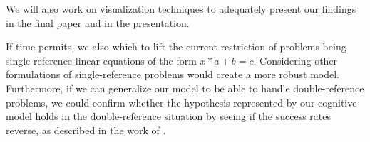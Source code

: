 \documentclass[10pt,letterpaper]{article}
\begin{document}
	We will also work on visualization techniques to adequately present our findings in the final paper and in the presentation.
	
	If time permits, we also which to lift the current restriction of problems being single-reference linear equations of the form $x*a+b=c$. Considering other formulations of single-reference problems would create a more robust model. Furthermore, if we can generalize our model to be able to handle double-reference problems, we could confirm whether the hypothesis represented by our cognitive model holds in the double-reference situation by seeing if the success rates reverse, as described in the work of .
	
	
	
	
	
\end{document}
